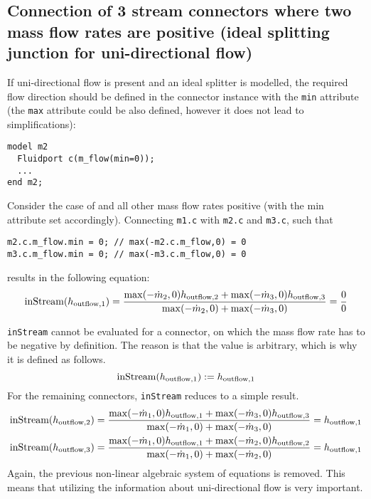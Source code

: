 \subsection{Connection of 3 stream connectors where two mass flow rates are positive (ideal splitting junction for uni-directional flow)}\label{connection-of-3-stream-connectors-where-two-mass-flow-rates-are-positive-ideal-splitting-junction-for-uni-directional-flow}

If uni-directional flow is present and an ideal splitter is modelled,
the required flow direction should be defined in the connector instance
with the \lstinline!min! attribute (the \lstinline!max! attribute could be also defined,
however it does not lead to simplifications):
\begin{lstlisting}[language=modelica]
model m2
  Fluidport c(m_flow(min=0));
  ...
end m2;
\end{lstlisting}

Consider the case of and all other mass flow rates positive (with the
min attribute set accordingly). Connecting \lstinline!m1.c! with \lstinline!m2.c! and \lstinline!m3.c!, such
that
\begin{lstlisting}[language=modelica]
m2.c.m_flow.min = 0; // max(-m2.c.m_flow,0) = 0
m3.c.m_flow.min = 0; // max(-m3.c.m_flow,0) = 0
\end{lstlisting}
results in the following equation:
\begin{equation*}
\text{\lstinline!inStream!}(h_{\mathrm{outflow},1})=\frac{\operatorname{max}(-\dot{m}_2,0)h_{\mathrm{outflow},2}+\operatorname{max}(-\dot{m}_3,0)h_{\mathrm{outflow},3}}{\operatorname{max}(-\dot{m}_2,0)+\operatorname{max}(-\dot{m}_3,0)}=\frac{0}{0}
\end{equation*}

\lstinline!inStream! cannot be evaluated for a connector, on which
the mass flow rate has to be negative by definition. The reason is that
the value is arbitrary, which is why it is defined as follows.
\begin{equation*}
\text{\lstinline!inStream!}(h_{\mathrm{outflow},1}):=h_{\mathrm{outflow},1}
\end{equation*}
For the remaining connectors, \lstinline!inStream! reduces to a simple result.
\begin{align*}
\text{\lstinline!inStream!}(h_{\mathrm{outflow},2}) &= \frac{\operatorname{max}(-\dot{m}_1,0)h_{\mathrm{outflow},1}+\operatorname{max}(-\dot{m}_3,0)h_{\mathrm{outflow},3}}{\operatorname{max}(-\dot{m}_1,0)+\operatorname{max}(-\dot{m}_3,0)}
  = h_{\mathrm{outflow},1}\\
\text{\lstinline!inStream!}(h_{\mathrm{outflow},3}) &= \frac{\operatorname{max}(-\dot{m}_1,0)h_{\mathrm{outflow},1}+\operatorname{max}(-\dot{m}_2,0)h_{\mathrm{outflow},2}}{\operatorname{max}(-\dot{m}_1,0)+\operatorname{max}(-\dot{m}_2,0)}
  = h_{\mathrm{outflow},1}
\end{align*}
Again, the previous non-linear algebraic system of equations is removed.
This means that utilizing the information about uni-directional flow is
very important.

